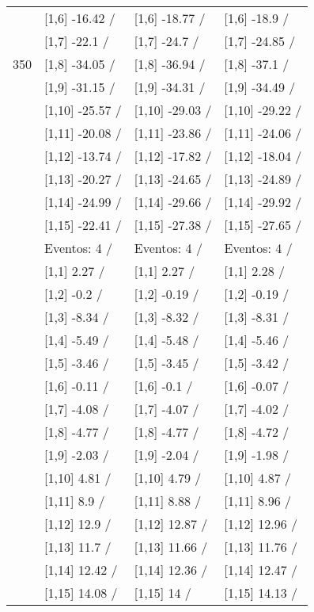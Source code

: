 \begin{table}
\begin{tabular}[t]{llll}
 & {}[1,6] -16.42  / & {}[1,6] -18.77  / & {}[1,6] -18.9  /\\
 & {}[1,7] -22.1  / & {}[1,7] -24.7  / & {}[1,7] -24.85  /\\
350 & {}[1,8] -34.05  / & {}[1,8] -36.94  / & {}[1,8] -37.1  /\\
\addlinespace
 & {}[1,9] -31.15  / & {}[1,9] -34.31  / & {}[1,9] -34.49  /\\
 & {}[1,10] -25.57  / & {}[1,10] -29.03  / & {}[1,10] -29.22  /\\
 & {}[1,11] -20.08  / & {}[1,11] -23.86  / & {}[1,11] -24.06  /\\
 & {}[1,12] -13.74  / & {}[1,12] -17.82  / & {}[1,12] -18.04  /\\
 & {}[1,13] -20.27  / & {}[1,13] -24.65  / & {}[1,13] -24.89  /\\
\addlinespace
 & {}[1,14] -24.99  / & {}[1,14] -29.66  / & {}[1,14] -29.92  /\\
 & {}[1,15] -22.41  / & {}[1,15] -27.38  / & {}[1,15] -27.65  /\\
 & Eventos:  4 / & Eventos:  4 / & Eventos:  4 /\\
 & {}[1,1] 2.27  / & {}[1,1] 2.27  / & {}[1,1] 2.28  /\\
 & {}[1,2] -0.2  / & {}[1,2] -0.19  / & {}[1,2] -0.19  /\\
\addlinespace
 & {}[1,3] -8.34  / & {}[1,3] -8.32  / & {}[1,3] -8.31  /\\
 & {}[1,4] -5.49  / & {}[1,4] -5.48  / & {}[1,4] -5.46  /\\
 & {}[1,5] -3.46  / & {}[1,5] -3.45  / & {}[1,5] -3.42  /\\
 & {}[1,6] -0.11  / & {}[1,6] -0.1  / & {}[1,6] -0.07  /\\
 & {}[1,7] -4.08  / & {}[1,7] -4.07  / & {}[1,7] -4.02  /\\
\addlinespace
500 & {}[1,8] -4.77  / & {}[1,8] -4.77  / & {}[1,8] -4.72  /\\
 & {}[1,9] -2.03  / & {}[1,9] -2.04  / & {}[1,9] -1.98  /\\
 & {}[1,10] 4.81  / & {}[1,10] 4.79  / & {}[1,10] 4.87  /\\
 & {}[1,11] 8.9  / & {}[1,11] 8.88  / & {}[1,11] 8.96  /\\
 & {}[1,12] 12.9  / & {}[1,12] 12.87  / & {}[1,12] 12.96  /\\
\addlinespace
 & {}[1,13] 11.7  / & {}[1,13] 11.66  / & {}[1,13] 11.76  /\\
 & {}[1,14] 12.42  / & {}[1,14] 12.36  / & {}[1,14] 12.47  /\\
 & {}[1,15] 14.08  / & {}[1,15] 14  / & {}[1,15] 14.13  /\\
\bottomrule
\end{tabular}
\end{table}
